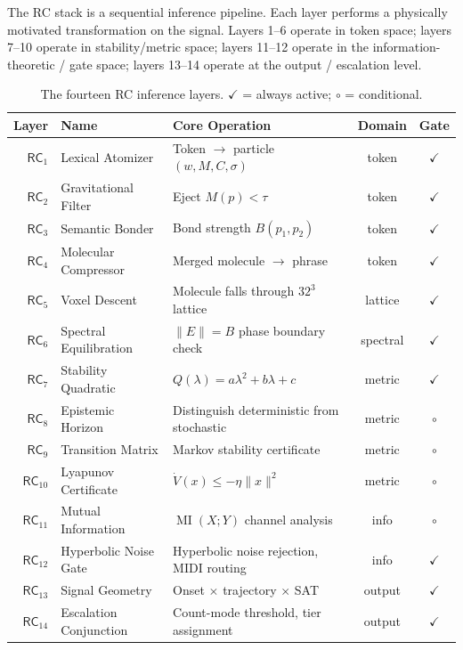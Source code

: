 \documentclass[11pt,twoside]{article}
\theoremstyle{plain}
\theoremstyle{definition}
\theoremstyle{remark}
\DeclareMathOperator{\MI}{MI}
\newcommand{\RC}[1]{\textsf{RC}_{#1}}
\begin{document}
The RC stack is a sequential inference pipeline.  Each layer performs a
physically motivated transformation on the signal.  Layers 1--6 operate in
token space; layers 7--10 operate in stability/metric space; layers 11--12
operate in the information-theoretic / gate space; layers 13--14 operate at
the output / escalation level.

\begin{table}[h!]
\centering\small\setlength{\tabcolsep}{5pt}
\caption{The fourteen RC inference layers.  $\checkmark$ = always active; $\circ$ = conditional.}
\begin{tabular}{rllcc}
\toprule
Layer & Name & Core Operation & Domain & Gate \\
\midrule
$\RC{1}$ & Lexical Atomizer       & Token $\to$ particle $(w,M,C,\sigma)$     & token    & $\checkmark$ \\
$\RC{2}$ & Gravitational Filter   & Eject $M(p)<\tau$                          & token    & $\checkmark$ \\
$\RC{3}$ & Semantic Bonder        & Bond strength $B(p_1,p_2)$                 & token    & $\checkmark$ \\
$\RC{4}$ & Molecular Compressor   & Merged molecule $\to$ phrase               & token    & $\checkmark$ \\
$\RC{5}$ & Voxel Descent          & Molecule falls through $32^3$ lattice      & lattice  & $\checkmark$ \\
$\RC{6}$ & Spectral Equilibration & $\|E\|=B$ phase boundary check             & spectral & $\checkmark$ \\
$\RC{7}$ & Stability Quadratic    & $Q(\lambda)=a\lambda^2+b\lambda+c$         & metric   & $\checkmark$ \\
$\RC{8}$ & Epistemic Horizon      & Distinguish deterministic from stochastic  & metric   & $\circ$ \\
$\RC{9}$ & Transition Matrix      & Markov stability certificate               & metric   & $\circ$ \\
$\RC{10}$& Lyapunov Certificate   & $\dot{V}(x)\leq -\eta\|x\|^2$             & metric   & $\circ$ \\
$\RC{11}$& Mutual Information     & $\MI(X;Y)$ channel analysis                & info     & $\circ$ \\
$\RC{12}$& Hyperbolic Noise Gate  & Hyperbolic noise rejection, MIDI routing   & info     & $\checkmark$ \\
$\RC{13}$& Signal Geometry        & Onset $\times$ trajectory $\times$ SAT     & output   & $\checkmark$ \\
$\RC{14}$& Escalation Conjunction & Count-mode threshold, tier assignment      & output   & $\checkmark$ \\
\bottomrule
\end{tabular}
\end{table}
\end{document}
